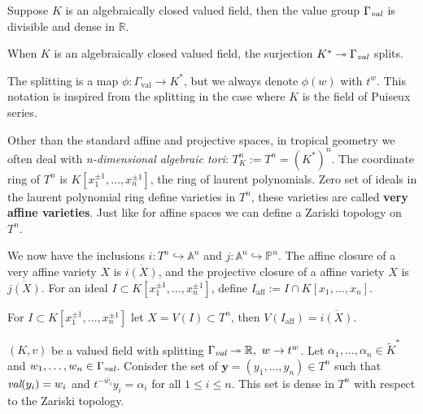     \begin{lemma}
        Suppose $K$ is an algebraically closed valued field, then the value group $\Gamma_{\emph{val}}$ is divisible and dense in $\mathbb{R}$.
    \end{lemma}

    \begin{lemma}
        When $K$ is an algebraically closed valued field, the surjection $K^{*} \twoheadrightarrow \Gamma_{\emph{val}}$ splits.
    \end{lemma}

    The splitting is a map $\phi: \Gamma_{\text{val}} \to K^{*}$, but we always denote $\phi(w)$ with $t^w$. This notation is inspired from the splitting in the case where $K$ is the field of Puiseux series.
    \par Other than the standard affine and projective spaces, in tropical geometry we often deal with \textit{n-dimensional algebraic tori}: $T^{n}_{K} := T^n = (K^{*})^n$. 
    The coordinate ring of $T^{n}$ is $K[x_{1}^{\pm 1},\dots,x_{n}^{\pm 1}]$, the ring of laurent polynomials. 
    Zero set of ideals in the laurent polynomial ring define varieties in $T^n$, these varieties are called \textbf{very affine varieties}.
    Just like for affine spaces we can define a Zariski topology on $T^{n}$.
    \par We now have the inclusions $i: T^{n} \hookrightarrow \mathbb{A}^n$ and $j: \mathbb{A}^{n} \hookrightarrow \mathbb{P}^{n}$. 
    The affine closure of a very affine variety $X$ is $\overline{i(X)}$, and the projective closure of a affine variety $X$ is $\overline{j(X)}$. 
    For an ideal $I \subset K[x_{1}^{\pm 1},\dots,x_{n}^{\pm 1}]$, define $I_{\text{aff}}:= I \cap K[x_{1},\dots,x_{n}]$.

    \begin{proposition}
        For $I \subset K[x_{1}^{\pm 1},\dots,x_{n}^{\pm 1}]$ let $X = V(I) \subset T^n$, then $V(I_{\text{aff}}) = \overline{i(X)}$.
    \end{proposition}

    \begin{proposition}
        \label{densenessprop}
        $(K,v)$ be a valued field with splitting $\Gamma_{\emph{val}} \twoheadrightarrow \mathbb{R},~w \to t^{w}$.
        Let $\alpha_{1}, \dots,\alpha_{n} \in \tilde{K}^{*}$ and $w_1, \dots, w_n \in \Gamma_{\emph{val}}$. 
        Conisder the set of $\textbf{y} = (y_1, \dots, y_n) \in T^{n}$ such that $\emph{val}(y_{i}) = w_{i}$ and $\overline{t^{-w_i}y_i} = \alpha_{i}$ for all $1\leq i \leq n$.
        This set is dense in $T^n$ with respect to the Zariski topology.
    \end{proposition}

